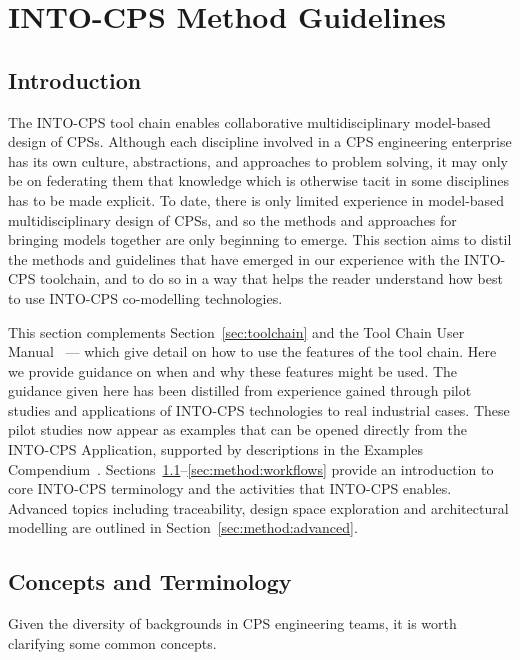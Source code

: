 \section{INTO-CPS Method Guidelines}
\label{sec:method}


\subsection{Introduction}
\label{sec:method:intro}

The INTO-CPS tool chain enables collaborative multidisciplinary model-based design of CPSs. Although each discipline involved in a CPS engineering enterprise has its own culture, abstractions, and approaches to problem solving, it may only be on federating them that knowledge which is otherwise tacit in some disciplines has to be made explicit. To date, there is only limited experience in model-based multidisciplinary design of CPSs, and so the methods and approaches for bringing models together are only beginning to emerge. This section aims to distil the methods and guidelines that have emerged in our experience with the INTO-CPS toolchain, and to do so in a way that helps the reader understand how best to use INTO-CPS co-modelling technologies.

This section complements Section~\ref{sec:toolchain} and the Tool Chain User Manual~\cite{Larsen&18a} --- which give detail on how to use the features of the tool chain. Here we provide guidance on when and why these features might be used. The guidance given here has been distilled from experience gained through pilot studies and applications of INTO-CPS technologies to real industrial cases. These pilot studies now appear as examples that can be opened directly from the INTO-CPS Application, supported by descriptions in the Examples Compendium~\cite{Fitzgerald&18}. Sections~\ref{sec:method:intro}--\ref{sec:method:workflows} provide an introduction to core INTO-CPS terminology and the activities that INTO-CPS enables. Advanced topics including traceability, design space exploration and architectural modelling are outlined in Section~\ref{sec:method:advanced}.

\subsection{Concepts and Terminology}
\label{sec:method:concepts}

Given the diversity of backgrounds in CPS engineering teams, it is worth clarifying some common concepts.

